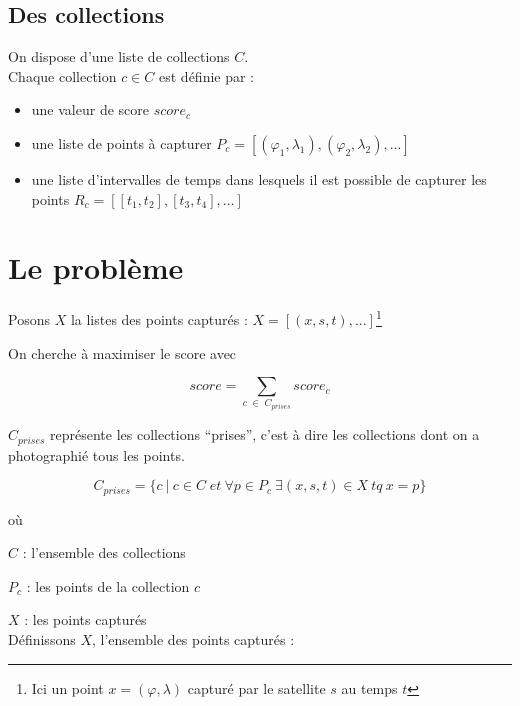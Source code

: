\documentclass[11pt, oneside]{article}   	%
\begin{document}
\subsection{Des collections}

On dispose d'une liste de collections $C$. \\

Chaque collection $c \in C$ est définie par :

\begin{itemize}
\item une valeur de score $score_c$
\item une liste de points à capturer  $P_c = [(\varphi_1, \lambda_1), (\varphi_2, \lambda_2), ...]$
\item une liste d'intervalles de temps dans lesquels il est possible de capturer les points
$R_c = [[t_1, t_2], [t_3, t_4], ...]$
\end{itemize}


\section{Le problème}

Posons $X$ la listes des points capturés : $X = [(x, s, t),
...]$\footnote{Ici un point $x = (\varphi, \lambda)$ capturé par le satellite $s$ au temps $t$}

On cherche à maximiser le score avec

\begin{equation}
	\mathit{score} = \sum_{c \; \in \; C_{\mathit{prises}}} \mathit{score}_c
\end{equation}

$C_{\mathit{prises}}$ représente les collections ``prises'', c'est à dire
les collections dont on a photographié tous les points.

\begin{equation}
	C_{\mathit{prises}} = \{ c \ | \ c  \in  C \; \mathit{et} \ \forall p \in P_{c} \ \exists (x, s, t) \in X \ \mathit{tq} \ x = p \}
\end{equation}

o\`u

$C$ : l'ensemble des collections

$P_{c}$ : les points de la collection $c$

$X$ : les points capturés \\

Définissons $X$, l'ensemble des points capturés :
\end{document}
